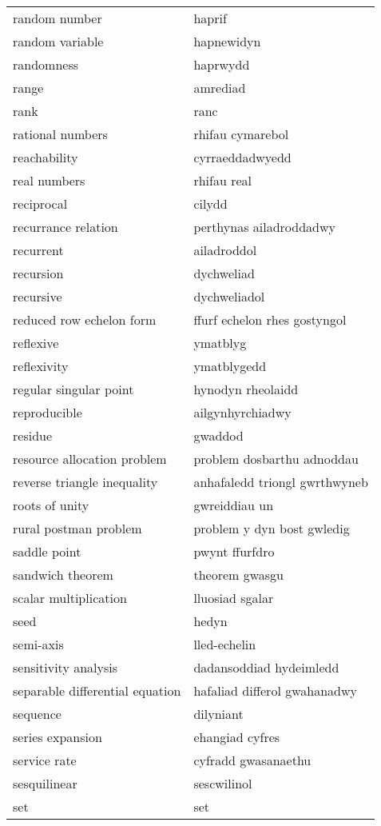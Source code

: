 \begin{supertabular}{p{0.22\textwidth}p{0.22\textwidth}}
random number & haprif \\
random variable & hapnewidyn \\
randomness & haprwydd \\
range & amrediad \\
rank & ranc \\
rational numbers & rhifau cymarebol \\
reachability & cyrraeddadwyedd \\
real numbers & rhifau real \\
reciprocal & cilydd \\
recurrance relation & perthynas ailadroddadwy \\
recurrent & ailadroddol \\
recursion & dychweliad \\
recursive & dychweliadol \\
reduced row echelon form & ffurf echelon rhes gostyngol \\
reflexive & ymatblyg \\
reflexivity & ymatblygedd \\
regular singular point & hynodyn rheolaidd \\
reproducible & ailgynhyrchiadwy \\
residue & gwaddod \\
resource allocation problem & problem dosbarthu adnoddau \\
reverse triangle inequality & anhafaledd triongl gwrthwyneb \\
roots of unity & gwreiddiau un \\
rural postman problem & problem y dyn bost gwledig \\
saddle point & pwynt ffurfdro \\
sandwich theorem & theorem gwasgu \\
scalar multiplication & lluosiad sgalar \\
seed & hedyn \\
semi-axis & lled-echelin \\
sensitivity analysis & dadansoddiad hydeimledd \\
separable differential equation & hafaliad differol gwahanadwy \\
sequence & dilyniant \\
series expansion & ehangiad cyfres \\
service rate & cyfradd gwasanaethu \\
sesquilinear & sescwilinol \\
set & set \\

\end{supertabular}
